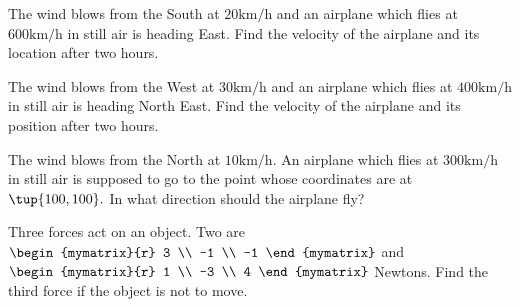 \begin{enumialphparenastyle}

\begin{ex} The wind blows from the South at $20\textrm{km}/\textrm{h}$ and an
airplane which flies at $600\textrm{km}/\textrm{h}$ in still air is heading
East. Find the velocity of the airplane and its location after
two hours. \vspace{1mm}
\end{ex}

\begin{ex} The wind blows from the West at $30\textrm{km}/\textrm{h}$ and an
airplane which flies at $400\textrm{km}/\textrm{h}$ in still air is heading
North East. Find the velocity of the airplane and its position
after two hours. \vspace{1mm}
\end{ex}

\begin{ex} The wind blows from the North at $10\textrm{km}/\textrm{h}$. An
airplane which flies at $300\textrm{km}/\textrm{h}$ in still air is supposed
to go to the point whose coordinates are at $\tup{100, 100 }. $ In what direction should the airplane fly? \vspace{1mm}
\end{ex}

\begin{ex} Three forces act on an object. Two are $\begin{mymatrix}{r}
3 \\
-1 \\
-1
\end{mymatrix} $ and $\begin{mymatrix}{r}
1 \\
-3 \\
4
\end{mymatrix} $ Newtons. Find the third force if the object is not to move.
\vspace{1mm}
\end{ex}


\end{enumialphparenastyle}
